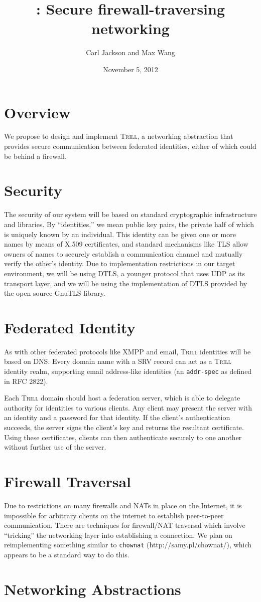 \documentclass[12pt]{article}
\title{\Trill: Secure firewall-traversing networking}
\author{Carl Jackson and Max Wang}
\date{November 5, 2012}
\makeatletter
\newcommand{\Trill}{\textsc{Trill}\xspace}
\renewcommand{\maketitle}{%
  \thispagestyle{plain}%
  \begin{center}%
    {\LARGE \@title \par}%
    {\large \@author \par}%
    {\large \@date \par}%
  \end{center}%
}
\makeatother
\begin{document}
\maketitle

\section*{Overview}
We propose to design and implement \Trill, a networking abstraction that
provides secure communication between federated identities, either of which
could be behind a firewall.

\section*{Security}
The security of our system will be based on standard cryptographic
infrastructure and libraries. By ``identities,'' we mean public key pairs, the
private half of which is uniquely known by an individual. This identity can be
given one or more names by means of X.509 certificates, and standard mechanisms
like TLS allow owners of names to securely establish a communication channel
and mutually verify the other's identity. Due to implementation restrictions in
our target environment, we will be using DTLS, a younger protocol that uses UDP
as its transport layer, and we will be using the implementation of DTLS
provided by the open source GnuTLS library.

\section*{Federated Identity}
As with other federated protocols like XMPP and email, \Trill identities will
be based on DNS.  Every domain name with a SRV record can act as a \Trill
identity realm, supporting email address-like identities (an \verb!addr-spec!
as defined in RFC 2822).

Each \Trill domain should host a federation server, which is able to delegate
authority for identities to various clients.  Any client may present the server
with an identity and a password for that identity.  If the client's
authentication succeeds, the server signs the client's key and returns the
resultant certificate.  Using these certificates, clients can then authenticate
securely to one another without further use of the server.

\section*{Firewall Traversal}
Due to restrictions on many firewalls and NATs in place on the Internet, it is
impossible for arbitrary clients on the internet to establish peer-to-peer
communication. There are techniques for firewall/NAT traversal which involve
``tricking'' the networking layer into establishing a connection. We plan on
reimplementing something similar to \texttt{chownat} (http://samy.pl/chownat/),
which appears to be a standard way to do this.

\section*{Networking Abstractions}
\end{document}
